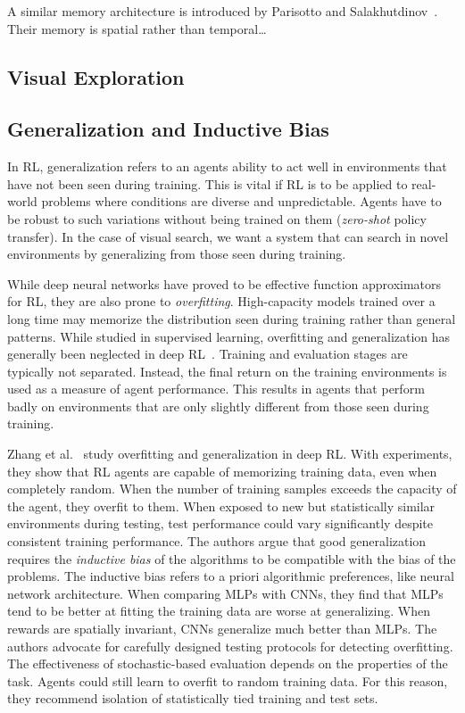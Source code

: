 A similar memory architecture is introduced by Parisotto and Salakhutdinov~\cite{parisotto_salakhutdinov_2017}.
Their memory is spatial rather than temporal\dots

\subsection{Visual Exploration}


\subsection{Generalization and Inductive Bias}

In RL, generalization refers to an agents ability to act well in environments that have not been seen during training.
This is vital if RL is to be applied to real-world problems where conditions are diverse and unpredictable.
Agents have to be robust to such variations without being trained on them (\textit{zero-shot} policy transfer).
In the case of visual search, we want a system that can search in novel environments by generalizing from those seen during training.

While deep neural networks have proved to be effective function approximators for RL, they are also prone to \textit{overfitting}.
High-capacity models trained over a long time may memorize the distribution seen during training rather than general patterns.
While studied in supervised learning, overfitting and generalization has generally been neglected in deep RL~\cite{kirk_survey_2022}.
Training and evaluation stages are typically not separated.
Instead, the final return on the training environments is used as a measure of agent performance.
This results in agents that perform badly on environments that are only slightly different from those seen during training.

Zhang et al.~\cite{zhang_overfitting_2018} study overfitting and generalization in deep RL.
With experiments, they show that RL agents are capable of memorizing training data, even when completely random.
When the number of training samples exceeds the capacity of the agent, they overfit to them.
When exposed to new but statistically similar environments during testing, test performance could vary significantly despite consistent training performance.
The authors argue that good generalization requires the \textit{inductive bias} of the algorithms to be compatible with the bias of the problems.
The inductive bias refers to a priori algorithmic preferences, like neural network architecture.
When comparing MLPs with CNNs, they find that MLPs tend to be better at fitting the training data are worse at generalizing.
When rewards are spatially invariant, CNNs generalize much better than MLPs.
The authors advocate for carefully designed testing protocols for detecting overfitting.
The effectiveness of stochastic-based evaluation depends on the properties of the task.
Agents could still learn to overfit to random training data. 
For this reason, they recommend isolation of statistically tied training and test sets.

